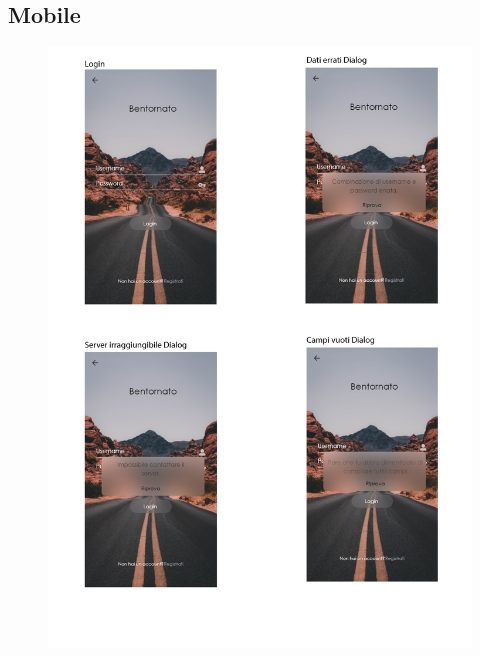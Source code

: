 \subsection{Mobile}
\begin{figure}
    \includegraphics[width=\textwidth]{Figures/LoginMockup.png}
\end{figure}
